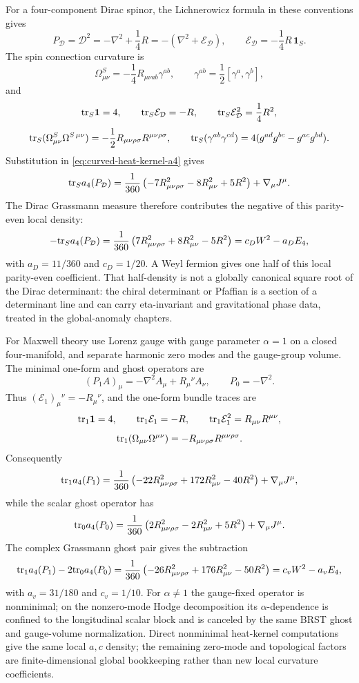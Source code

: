 For a four-component Dirac spinor, the Lichnerowicz formula in these
conventions gives
\[
  P_{\mathcal D}
  =
  \mathcal D^2
  =
  -\nabla^2+\frac14R
  =
  -(\nabla^2+\mathcal E_{\mathcal D}),
  \qquad
  \mathcal E_{\mathcal D}=-\frac14R\,\mathbf 1_S .
\]
The spin connection curvature is
\[
  \Omega_{\mu\nu}^S
  =
  -\frac14R_{\mu\nu ab}\gamma^{ab},
  \qquad
  \gamma^{ab}=\frac12[\gamma^a,\gamma^b],
\]
and
\[
  {\rm tr}_S\mathbf 1=4,\qquad
  {\rm tr}_S\mathcal E_{\mathcal D}=-R,\qquad
  {\rm tr}_S\mathcal E_{\mathcal D}^2=\frac14R^2,
\]
\[
  {\rm tr}_S(\Omega_{\mu\nu}^S\Omega^{S\,\mu\nu})
  =
  -\frac12R_{\mu\nu\rho\sigma}R^{\mu\nu\rho\sigma},
  \qquad
  {\rm tr}_S(\gamma^{ab}\gamma^{cd})
  =
  4(g^{ad}g^{bc}-g^{ac}g^{bd}).
\]
Substitution in \eqref{eq:curved-heat-kernel-a4} gives
\[
  {\rm tr}_S a_4(P_{\mathcal D})
  =
  \frac1{360}
  \left(
    -7R_{\mu\nu\rho\sigma}^2
    -8R_{\mu\nu}^2
    +5R^2
  \right)
  +\nabla_\mu J^\mu .
\]
The Dirac Grassmann measure therefore contributes the negative of this
parity-even local density:
\[
  -{\rm tr}_S a_4(P_{\mathcal D})
  =
  \frac1{360}
  \left(
    7R_{\mu\nu\rho\sigma}^2
    +8R_{\mu\nu}^2
    -5R^2
  \right)
  =
  c_DW^2-a_DE_4,
\]
with \(a_D=11/360\) and \(c_D=1/20\).  A Weyl fermion gives one half of this
local parity-even coefficient.  That half-density is not a globally canonical
square root of the Dirac determinant: the chiral determinant or Pfaffian is a
section of a determinant line and can carry eta-invariant and gravitational
phase data, treated in the global-anomaly chapters.

For Maxwell theory use Lorenz gauge with gauge parameter \(\alpha=1\) on a
closed four-manifold, and separate harmonic zero modes and the gauge-group
volume.  The minimal one-form and ghost operators are
\[
  (P_1A)_\mu
  =
  -\nabla^2 A_\mu+R_\mu{}^\nu A_\nu,
  \qquad
  P_0=-\nabla^2 .
\]
Thus \((\mathcal E_1)_\mu{}^\nu=-R_\mu{}^\nu\), and the one-form bundle traces
are
\[
  {\rm tr}_1\mathbf 1=4,\qquad
  {\rm tr}_1\mathcal E_1=-R,\qquad
  {\rm tr}_1\mathcal E_1^2=R_{\mu\nu}R^{\mu\nu},
\]
\[
  {\rm tr}_1(\Omega_{\mu\nu}\Omega^{\mu\nu})
  =
  -R_{\mu\nu\rho\sigma}R^{\mu\nu\rho\sigma}.
\]
Consequently
\[
  {\rm tr}_1a_4(P_1)
  =
  \frac1{360}
  \left(
    -22R_{\mu\nu\rho\sigma}^2
    +172R_{\mu\nu}^2
    -40R^2
  \right)
  +\nabla_\mu J^\mu ,
\]
while the scalar ghost operator has
\[
  {\rm tr}_0a_4(P_0)
  =
  \frac1{360}
  \left(
    2R_{\mu\nu\rho\sigma}^2
    -2R_{\mu\nu}^2
    +5R^2
  \right)
  +\nabla_\mu J^\mu .
\]
The complex Grassmann ghost pair gives the subtraction
\[
  {\rm tr}_1a_4(P_1)-2{\rm tr}_0a_4(P_0)
  =
  \frac1{360}
  \left(
    -26R_{\mu\nu\rho\sigma}^2
    +176R_{\mu\nu}^2
    -50R^2
  \right)
  =
  c_vW^2-a_vE_4,
\]
with \(a_v=31/180\) and \(c_v=1/10\).  For \(\alpha\ne1\) the gauge-fixed
operator is nonminimal; on the nonzero-mode Hodge decomposition its
\(\alpha\)-dependence is confined to the longitudinal scalar block and is
canceled by the same BRST ghost and gauge-volume normalization.  Direct
nonminimal heat-kernel computations give the same local \(a,c\) density; the
remaining zero-mode and topological factors are finite-dimensional global
bookkeeping rather than new local curvature coefficients.

